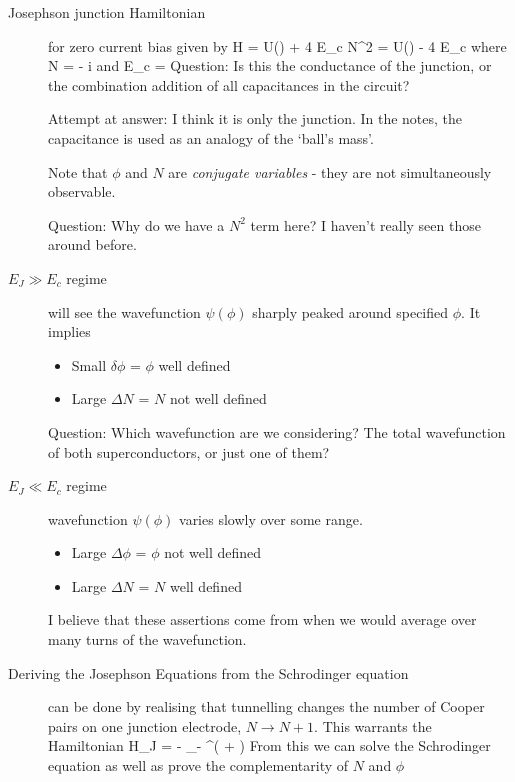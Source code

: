 \begin{description}
\item[Josephson junction Hamiltonian ] for zero current bias given by 
\beq
H = U(\phi) + 4 E_c N^2 = U(\phi) - 4 E_c 
\eeq
where
\beq
N = - i \frac{\p}{\p \phi}
\eeq
and
\beq
E_c = 
\eeq
Question: Is this the conductance of the junction, or the combination addition of all capacitances in the circuit? 

Attempt at answer: I think it is only the junction. In the notes, the capacitance is used as an analogy of the `ball's mass'. 

Note that $\phi$ and $N$ are \emph{conjugate variables} - they are not simultaneously observable. 

Question: Why do we have a $N^2$ term here? I haven't really seen those around before. 




\item[$E_J \gg 	E_c$ regime] will see the wavefunction $\psi(\phi)$ sharply peaked around specified $\phi$. It implies
\begin{itemize}
\item Small $\delta \phi$ = $\phi$ well defined
\item Large $\Delta N$ = $N$ not well defined
\end{itemize}


Question: Which wavefunction are we considering? The total wavefunction of both superconductors, or just one of them? 

\item[$E_J \ll E_c$ regime] wavefunction $\psi(\phi)$ varies slowly over  some range. 
\begin{itemize}
\item Large $\Delta \phi$ = $\phi$ not well defined
\item Large $\Delta N$ = $N$ well defined
\end{itemize}
I believe that these assertions come from when we would average over many turns of the wavefunction. 

\item[Deriving the Josephson Equations from the Schrodinger equation] can be done by realising that tunnelling changes the number of Cooper pairs on one junction electrode, $N \rightarrow N + 1$. This warrants the Hamiltonian
\beq
H_J = -  \sum_{- \infty}^\infty \left(   +   \right)
\eeq
From this we can solve the Schrodinger equation as well as prove the complementarity of $N$ and $\phi$

\end{description}

